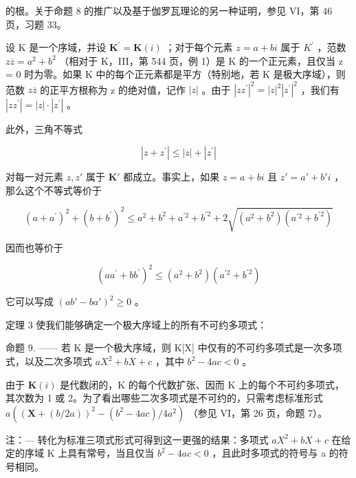 的根。关于命题 8 的推广以及基于伽罗瓦理论的另一种证明，参见 VI，第 46 页，习题 33。

设 K 是一个序域，并设 \(\mathbf{K}^{\prime} = \mathbf{K}(i)\) ；对于每个元素 \(z = a + bi\) 属于 \(K^{\prime}\) ，范数 \(z\overline{z} = a^{2} + b^{2}\) （相对于 K，III，第 544 页，例 1）是 K 的一个正元素，且仅当 z = 0 时为零。如果 K 中的每个正元素都是平方（特别地，若 K 是极大序域），则范数 \(z\overline{z}\) 的正平方根称为 z 的绝对值，记作 \(|z|\) 。由于 \(|zz^{\prime}|^{2} = |z|^{2} |z^{\prime}|^{2}\) ，我们有 \(|zz^{\prime}| = |z| \cdot |z^{\prime}|\) 。

此外，三角不等式

\[
\left| z + z ^ {\prime} \right| \leqslant \left| z \right| + \left| z ^ {\prime} \right|
\]

对每一对元素 \(z, z'\) 属于 \(\mathbf{K}'\) 都成立。事实上，如果 \(z = a + bi\) 且 \(z' = a' + b'i\) ，那么这个不等式等价于

\[
(a + a ^ {\prime}) ^ {2} + (b + b ^ {\prime}) ^ {2} \leqslant a ^ {2} + b ^ {2} + a ^ {\prime 2} + b ^ {\prime 2} + 2 \sqrt {(a ^ {2} + b ^ {2}) (a ^ {\prime 2} + b ^ {\prime 2})}
\]

因而也等价于

\[
(a a ^ {\prime} + b b ^ {\prime}) ^ {2} \leqslant (a ^ {2} + b ^ {2}) (a ^ {\prime 2} + b ^ {\prime 2})
\]

它可以写成 \((ab' - ba')^2 \geqslant 0\) 。

定理 3 使我们能够确定一个极大序域上的所有不可约多项式：

命题 9. —— 若 K 是一个极大序域，则 K{[}X{]} 中仅有的不可约多项式是一次多项式，以及二次多项式 \(aX^{2} + bX + c\) ，其中 \(b^{2} - 4ac < 0\) 。

由于 \(\mathbf{K}(i)\) 是代数闭的，K 的每个代数扩张、因而 K 上的每个不可约多项式，其次数为 1 或 2。为了看出哪些二次多项式是不可约的，只需考虑标准形式 \(a((\mathbf{X} + (b/2a))^2 - (b^2 - 4ac)/4a^2)\) （参见 VI，第 26 页，命题 7）。

注：--- 转化为标准三项式形式可得到这一更强的结果：多项式 \(aX^{2} + bX + c\) 在给定的序域 K 上具有常号，当且仅当 \(b^{2} - 4ac < 0\) ，且此时多项式的符号与 a 的符号相同。

